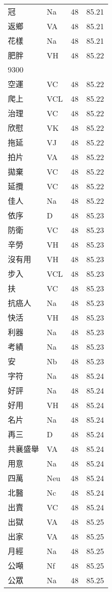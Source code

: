 \documentclass[twocolumn]{book}
\begin{document}
\begin{supertabular}{llrr}
冠 & Na & 48 &  85.21\\
返鄉 & VA & 48 &  85.21\\
花樣 & Na & 48 &  85.21\\
肥胖 & VH & 48 &  85.22\\
9300\\
空運 & VC & 48 &  85.22\\
爬上 & VCL & 48 &  85.22\\
治理 & VC & 48 &  85.22\\
欣慰 & VK & 48 &  85.22\\
拖延 & VJ & 48 &  85.22\\
拍片 & VA & 48 &  85.22\\
拋棄 & VC & 48 &  85.22\\
延攬 & VC & 48 &  85.22\\
佳人 & Na & 48 &  85.22\\
依序 & D & 48 &  85.23\\
防衛 & VC & 48 &  85.23\\
辛勞 & VH & 48 &  85.23\\
沒有用 & VH & 48 &  85.23\\
步入 & VCL & 48 &  85.23\\
扶 & VC & 48 &  85.23\\
抗癌人 & Na & 48 &  85.23\\
快活 & VH & 48 &  85.23\\
利器 & Na & 48 &  85.23\\
考績 & Na & 48 &  85.23\\
安 & Nb & 48 &  85.23\\
字符 & Na & 48 &  85.24\\
好評 & Na & 48 &  85.24\\
好用 & VH & 48 &  85.24\\
名片 & Na & 48 &  85.24\\
再三 & D & 48 &  85.24\\
共襄盛舉 & VA & 48 &  85.24\\
用意 & Na & 48 &  85.24\\
四萬 & Neu & 48 &  85.24\\
北醫 & Nc & 48 &  85.24\\
出賣 & VC & 48 &  85.24\\
出獄 & VA & 48 &  85.25\\
出家 & VA & 48 &  85.25\\
月經 & Na & 48 &  85.25\\
公噸 & Nf & 48 &  85.25\\
公眾 & Na & 48 &  85.25\\

\end{supertabular}
\end{document}
